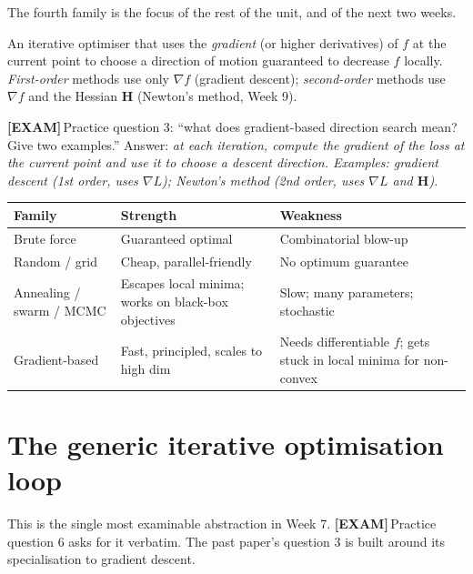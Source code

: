 \documentclass[11pt, a4paper]{article}
\newcommand{\thead}[1]{\textbf{#1}}
\newcommand{\examflag}{\textcolor{tipBd}{\textbf{[EXAM]}}\,}
\begin{document}
The fourth family is the focus of the rest of the unit, and of the next two weeks.

\begin{defbox}
An iterative optimiser that uses the \emph{gradient} (or higher derivatives) of $f$ at the current point to choose a direction of motion guaranteed to decrease $f$ locally. \emph{First-order} methods use only $\nabla f$ (gradient descent); \emph{second-order} methods use $\nabla f$ and the Hessian $\mathbf{H}$ (Newton's method, Week 9).
\end{defbox}

\examflag{}Practice question 3: ``what does gradient-based direction search mean? Give two examples.'' Answer: \emph{at each iteration, compute the gradient of the loss at the current point and use it to choose a descent direction. Examples: gradient descent (1st order, uses $\nabla L$); Newton's method (2nd order, uses $\nabla L$ and $\mathbf{H}$).}

\begin{tabularx}{\linewidth}{@{}lXX@{}}
\toprule
\thead{Family} & \thead{Strength} & \thead{Weakness} \\
\midrule
Brute force & Guaranteed optimal & Combinatorial blow-up \\
Random / grid & Cheap, parallel-friendly & No optimum guarantee \\
Annealing / swarm / MCMC & Escapes local minima; works on black-box objectives & Slow; many parameters; stochastic \\
Gradient-based & Fast, principled, scales to high dim & Needs differentiable $f$; gets stuck in local minima for non-convex \\
\bottomrule
\end{tabularx}

\section{The generic iterative optimisation loop}

This is the single most examinable abstraction in Week 7. \examflag{}Practice question 6 asks for it verbatim. The past paper's question 3 is built around its specialisation to gradient descent.
\end{document}
